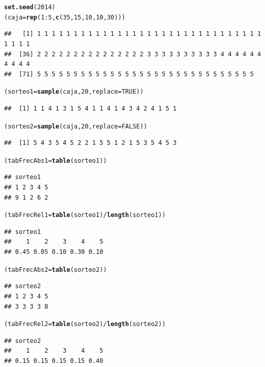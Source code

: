 \documentclass[10pt,a4paper]{article}\usepackage[]{graphicx}\usepackage[]{color}
\makeatletter
\newcommand{\hlnum}[1]{\textcolor[rgb]{0.686,0.059,0.569}{#1}}%
\newcommand{\hlopt}[1]{\textcolor[rgb]{0,0,0}{#1}}%
\newcommand{\hlstd}[1]{\textcolor[rgb]{0.345,0.345,0.345}{#1}}%
\newcommand{\hlkwb}[1]{\textcolor[rgb]{0.69,0.353,0.396}{#1}}%
\newcommand{\hlkwc}[1]{\textcolor[rgb]{0.333,0.667,0.333}{#1}}%
\newcommand{\hlkwd}[1]{\textcolor[rgb]{0.737,0.353,0.396}{\textbf{#1}}}%
\newenvironment{kframe}{%
 \def\at@end@of@kframe{}%
 \ifinner\ifhmode%
  \def\at@end@of@kframe{\end{minipage}}%
  \begin{minipage}{\columnwidth}%
 \fi\fi%
 \def\FrameCommand##1{\hskip\@totalleftmargin \hskip-\fboxsep
 \colorbox{shadecolor}{##1}\hskip-\fboxsep
     \hskip-\linewidth \hskip-\@totalleftmargin \hskip\columnwidth}%
 \MakeFramed {\advance\hsize-\width
   \@totalleftmargin\z@ \linewidth\hsize
   \@setminipage}}%
 {\par\unskip\endMakeFramed%
 \at@end@of@kframe}
\newenvironment{knitrout}{}{} %
\makeatother
\begin{document}
\begin{knitrout}
\color{fgcolor}\begin{kframe}
\begin{alltt}
\hlkwd{set.seed}\hlstd{(}\hlnum{2014}\hlstd{)}
\hlstd{(caja}\hlkwb{=}\hlkwd{rep}\hlstd{(} \hlnum{1}\hlopt{:}\hlnum{5}\hlstd{,} \hlkwd{c}\hlstd{(}\hlnum{35}\hlstd{,} \hlnum{15}\hlstd{,} \hlnum{10}\hlstd{,} \hlnum{10}\hlstd{,} \hlnum{30}\hlstd{) ))}
\end{alltt}
\begin{verbatim}
##   [1] 1 1 1 1 1 1 1 1 1 1 1 1 1 1 1 1 1 1 1 1 1 1 1 1 1 1 1 1 1 1 1 1 1 1 1
##  [36] 2 2 2 2 2 2 2 2 2 2 2 2 2 2 2 3 3 3 3 3 3 3 3 3 3 4 4 4 4 4 4 4 4 4 4
##  [71] 5 5 5 5 5 5 5 5 5 5 5 5 5 5 5 5 5 5 5 5 5 5 5 5 5 5 5 5 5 5
\end{verbatim}
\begin{alltt}
\hlstd{(sorteo1} \hlkwb{=} \hlkwd{sample}\hlstd{(caja,} \hlnum{20}\hlstd{,} \hlkwc{replace} \hlstd{=} \hlnum{TRUE}\hlstd{))}
\end{alltt}
\begin{verbatim}
##  [1] 1 1 4 1 3 1 5 4 1 1 4 1 4 3 4 2 4 1 5 1
\end{verbatim}
\begin{alltt}
\hlstd{(sorteo2} \hlkwb{=} \hlkwd{sample}\hlstd{(caja,} \hlnum{20}\hlstd{,} \hlkwc{replace} \hlstd{=} \hlnum{FALSE}\hlstd{))}
\end{alltt}
\begin{verbatim}
##  [1] 5 4 3 5 4 5 2 2 1 5 5 1 2 1 5 3 5 4 5 3
\end{verbatim}
\begin{alltt}
\hlstd{(tabFrecAbs1}  \hlkwb{=} \hlkwd{table}\hlstd{(sorteo1))}
\end{alltt}
\begin{verbatim}
## sorteo1
## 1 2 3 4 5 
## 9 1 2 6 2
\end{verbatim}
\begin{alltt}
\hlstd{(tabFrecRel1}  \hlkwb{=} \hlkwd{table}\hlstd{(sorteo1)} \hlopt{/} \hlkwd{length}\hlstd{(sorteo1) )}
\end{alltt}
\begin{verbatim}
## sorteo1
##    1    2    3    4    5 
## 0.45 0.05 0.10 0.30 0.10
\end{verbatim}
\begin{alltt}
\hlstd{(tabFrecAbs2}  \hlkwb{=} \hlkwd{table}\hlstd{(sorteo2))}
\end{alltt}
\begin{verbatim}
## sorteo2
## 1 2 3 4 5 
## 3 3 3 3 8
\end{verbatim}
\begin{alltt}
\hlstd{(tabFrecRel2}  \hlkwb{=} \hlkwd{table}\hlstd{(sorteo2)} \hlopt{/} \hlkwd{length}\hlstd{(sorteo2) )}
\end{alltt}
\begin{verbatim}
## sorteo2
##    1    2    3    4    5 
## 0.15 0.15 0.15 0.15 0.40
\end{verbatim}
\end{kframe}
\end{knitrout}
\end{document}
